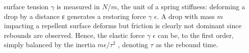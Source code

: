 \documentclass{sintefbeamer}
\begin{document}
\begin{frame}
  surface tension $\gamma$ is measured in
$N/m$, the unit of a spring stiffness: deforming a drop by a distance ε generates a restoring force
$\gamma$ $\epsilon$. 
A drop with mass $m$ impacting a repellent surface deforms but friction is clearly not dominant
since rebounds are observed. Hence, the elastic force $\gamma$ $\epsilon$ can be, to the first order, simply balanced
by the inertia $m\epsilon/\tau^2$ , denoting $\tau$ as the rebound time.
\end{frame}
\end{document}
